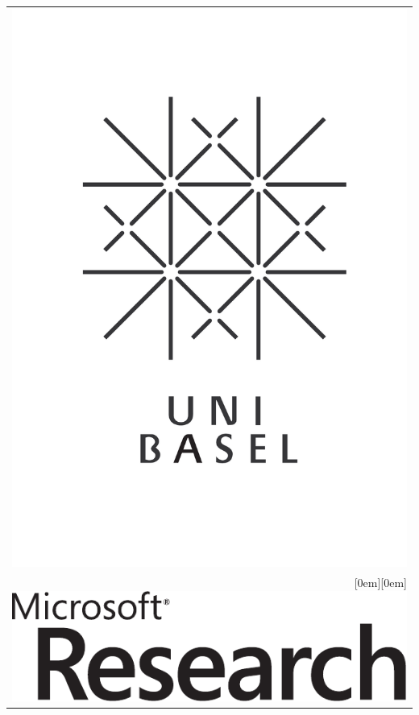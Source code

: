\documentclass[landscape,a2paper,fontscale=0.6]{baposter}
\begin{document}
\begin{poster}
{\begin{tabular}{r}
    \includegraphics[height=0.12\textheight]{logo}\\
    \raisebox{0em}[0em][0em]{\includegraphics[height=0.03\textheight]{msrlogo}}
  \end{tabular}
 }



\end{poster}
\end{document}
